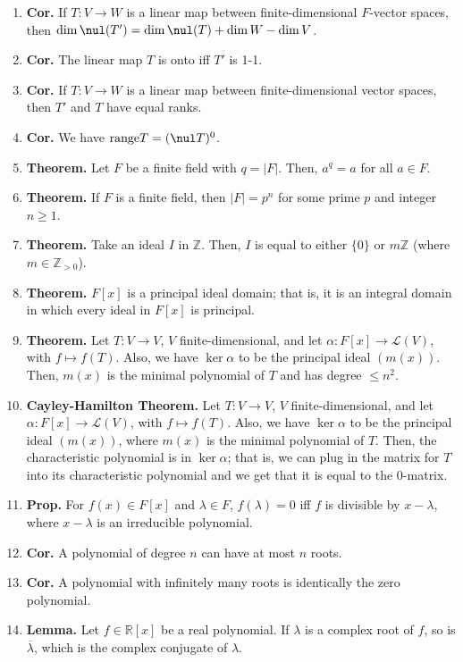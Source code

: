 \begin{enumerate}
	\item \textbf{Cor. } If $T: V \to W$ is a linear map between finite-dimensional $F$-vector spaces, then $\dim \nul(T') = \dim \nul(T) + \dim W - \dim V$. 
	\item \textbf{Cor. } The linear map $T$ is onto iff $T'$ is 1-1. 
	\item \textbf{Cor. } If $T: V \to W$ is a linear map between finite-dimensional vector spaces, then $T'$ and $T$ have equal ranks. 
	\item \textbf{Cor. } We have $\textrm{range}T = (\nul T)^0$. 
	\item \textbf{Theorem. } Let $F$ be a finite field with $q = |F|$. Then, $a^q=a$ for all $a \in F$. 
	\item \textbf{Theorem. } If $F$ is a finite field, then $|F|=p^n$ for some prime $p$ and integer $n \geq 1$. 
	\item \textbf{Theorem. } Take an ideal $I$ in $\mathbb{Z}$. Then, $I$ is equal to either $\{0\}$ or $m\mathbb{Z}$ (where $m \in \mathbb{Z}_{>0}$). 
	\item \textbf{Theorem. } $F[x]$ is a principal ideal domain; that is, it is an integral domain in which every ideal in $F[x]$ is principal. 
	\item \textbf{Theorem. } Let $T: V \to V$, $V$ finite-dimensional, and let $\alpha: F[x] \to \mathscr{L}(V)$, with $f \mapsto f(T)$. Also, we have $\ker\alpha$ to be the principal ideal $(m(x))$. Then, $m(x)$ is the minimal polynomial of $T$ and has degree $\leq n^2$. 
	\item \textbf{Cayley-Hamilton Theorem. } Let $T: V \to V$, $V$ finite-dimensional, and let $\alpha: F[x] \to \mathscr{L}(V)$, with $f \mapsto f(T)$. Also, we have $\ker\alpha$ to be the principal ideal $(m(x))$, where $m(x)$ is the minimal polynomial of $T$. Then, the characteristic polynomial is in $\ker\alpha$; that is, we can plug in the matrix for $T$ into its characteristic polynomial and we get that it is equal to the 0-matrix. 
	\item \textbf{Prop. } For $f(x) \in F[x]$ and $\lambda \in F$, $f(\lambda)=0$ iff $f$ is divisible by $x - \lambda$, where $x-\lambda$ is an irreducible polynomial. 
	\item \textbf{Cor. } A polynomial of degree $n$ can have at most $n$ roots. 	
	\item \textbf{Cor. } A polynomial with infinitely many roots is identically the zero polynomial. 
	\item \textbf{Lemma. } Let $f \in \mathbb{R}[x]$ be a real polynomial. If $\lambda$ is a complex root of $f$, so is $\overline{\lambda}$, which is the complex conjugate of $\lambda$. 

\end{enumerate}
